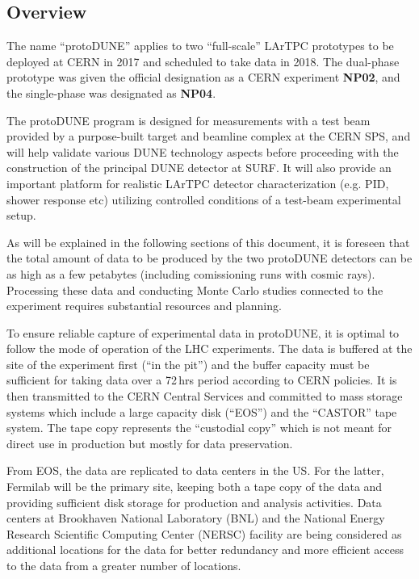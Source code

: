 \label{sec:protodune}
\subsection{Overview}

The name ``protoDUNE'' applies to two ``full-scale'' LArTPC prototypes to be deployed at CERN in 2017 and scheduled
to take data in 2018. The dual-phase prototype was given the official designation as a CERN experiment
\textbf{NP02}, and the single-phase was designated as \textbf{NP04}.

The protoDUNE program is designed for measurements with a test beam provided by a purpose-built target and beamline complex at the
CERN SPS, and will help validate various DUNE technology aspects before proceeding with the construction of the principal DUNE detector
at SURF. It will also provide an important platform for realistic LArTPC detector characterization (e.g. PID, shower response etc) utilizing
controlled conditions of a test-beam experimental setup.

As will be explained in the following sections of this document, it is foreseen that the total amount of data to be produced
by the two protoDUNE detectors can be as high as a few petabytes (including comissioning runs with cosmic rays). Processing
these data and conducting Monte Carlo studies connected to the experiment requires substantial resources and planning.

To ensure reliable capture of experimental data in protoDUNE, it is optimal to follow the mode of operation of the LHC experiments.
The data is buffered at the site of the experiment first (``in the pit'') and the buffer capacity must be sufficient for taking
data over a 72\,hrs period according to CERN policies. It is then transmitted to the CERN Central Services and committed to
mass storage systems which include a large capacity disk (``EOS'') and the ``CASTOR'' tape system. The tape copy
represents the ``custodial copy'' which is not meant for direct use in production but mostly for data preservation.

From EOS, the data are replicated to data centers in the US. For the latter, Fermilab will be the primary site, keeping both a tape copy of the data and providing
sufficient disk storage for production and analysis activities. Data centers at Brookhaven National Laboratory (BNL) and the
National Energy Research Scientific Computing Center (NERSC) facility are being considered as additional locations for the data
for better redundancy and more efficient access to the data from a greater number of locations.


